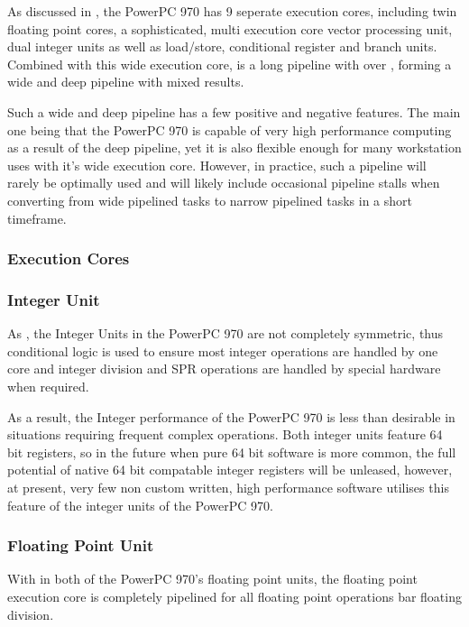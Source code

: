 \documentclass[a4paper,12pt]{article}
\begin{document}
As discussed in \cite[this article]{a2}, the PowerPC 970 has 9 seperate
execution cores, including twin floating point cores, a sophisticated,
multi execution core vector processing unit, dual integer units as well
as load/store, conditional register and branch units. Combined with this
wide execution core, is a long pipeline with over 
\cite[100 execution slots]{a1}, forming a wide and deep pipeline with
mixed results.


Such a wide and deep pipeline has a few positive and negative features.
The main one being that the PowerPC 970 is capable of very high
performance computing as a result of the deep pipeline, yet it is also
flexible enough for many workstation uses with it's wide execution core.
However, in practice, such a pipeline will rarely be optimally used and
will likely include occasional pipeline stalls when converting from wide
pipelined tasks to narrow pipelined tasks in a short timeframe.

\subsubsection{Execution Cores}

\subsubsection{Integer Unit}

As \cite[discussed in detail]{a2}, the Integer Units in the PowerPC 970 are not
completely symmetric, thus conditional logic is used to ensure 
most integer operations are handled by one core and integer division 
and SPR operations are handled by special hardware when required.


As a result, the Integer performance of the PowerPC 970 is less than desirable
in situations requiring frequent complex operations. Both integer units
feature 64 bit registers, so in the future when pure 64 bit software is
more common, the full potential of native 64 bit compatable integer
registers will be unleased, however, at present, very few non custom
written, high performance software utilises this feature of the integer
units of the PowerPC 970.
 
\subsubsection{Floating Point Unit}

With \cite[80 registers, (32 PowerPC architectural registers and 48
rename registers)]{a2} in both of the PowerPC 970's floating point units, the
floating point execution core is completely pipelined for all floating
point operations bar floating division. 
\end{document}
